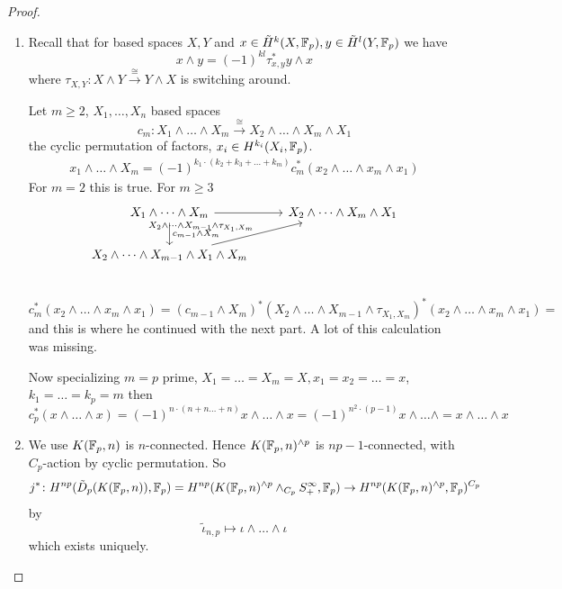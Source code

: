 \documentclass[language=english]{TemplateLecture}
\begin{document}
\begin{proof}
    \begin{enumerate}
        \item Recall that for based spaces \(X,Y\) and \(x \in \tilde H^k(X,\mathbb{F}_p), y \in \tilde H^l(Y, \mathbb{F}_p)\) we have
        \[x\wedge y = (-1)^{kl}\tau_{x,y}^* y\wedge x\]
        where \(\tau_{X,Y}\colon X\wedge Y \xrightarrow{\cong} Y\wedge X\) is switching around.

        Let \(m\geq 2\), \(X_1, \dots, X_n\) based spaces
        \[c_m\colon X_1\wedge \dots \wedge X_m \xrightarrow{\cong} X_2\wedge \dots \wedge X_m\wedge X_1\]
        the cyclic permutation of factors, \(x_i\in H^{k_i}(X_i, \mathbb{F}_p)\).
        \[\begin{split}
            x_1\wedge \dots \wedge X_m = (-1)^{k_1 \cdot (k_2+k_3+\dots + k_m)} c_m^*(x_2\wedge \dots \wedge x_m \wedge x_1)
        \end{split}\]
        For \(m=2\) this is true. For \(m\geq 3\)
        \[\begin{tikzcd}
            X_1\wedge\dots\wedge X_m \ar[d, "c_{m-1}\wedge X_m"]\ar[r] & X_2\wedge\dots\wedge X_m \wedge X_1 \\
            X_2\wedge\dots\wedge X_{m-1}\wedge X_1\wedge X_m\ar[ru, "X_2\wedge\dots \wedge X_{m-1}\wedge \tau_{X_1, X_m}"] & \\
        \end{tikzcd}\]
        \[c_m^*(x_2\wedge \dots\wedge x_m\wedge x_1) = (c_{m-1}\wedge X_m)^*(X_2\wedge \dots\wedge X_{m-1}\wedge \tau_{X_1, X_m})^*(x_2\wedge \dots\wedge x_m\wedge x_1) =\]
        and this is where he continued with the next part. A lot of this calculation was missing.

        Now specializing \(m = p\) prime, \(X_1= \dots = X_m = X, x_1 = x_2 = \dots = x\), \(k_1 = \dots = k_p = m\) then
        \[c_p^*(x\wedge \dots \wedge x) = (-1)^{n\cdot (n+n\dots +n)} x\wedge\dots \wedge x = (-1)^{n^2 \cdot (p-1)} x\wedge \dots \wedge = x\wedge \dots \wedge x\]

        \item We use \(K(\mathbb{F}_p,n)\) is \(n\)-connected. Hence \(K(\mathbb{F}_p, n)^{\wedge p}\) is \(np -1\)-connected, with \(C_p\)-action by cyclic permutation. So
        \[j^*\colon H^{np}(\tilde D_p(K(\mathbb{F}_p, n)), \mathbb{F}_p) =H^{np}(K(\mathbb{F}_p,n)^{\wedge p}\wedge_{C_p}S^\infty_+, \mathbb{F}_p) \to H^{np}(K(\mathbb{F}_p, n)^{\wedge p}, \mathbb{F}_p)^{C_p}\]
        by
        \[\tilde\iota_{n,p}\mapsto \iota\wedge \dots \wedge \iota\]
        which exists uniquely.
    \end{enumerate}
\end{proof}
\end{document}
